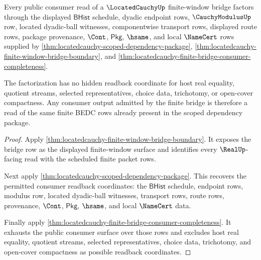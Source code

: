 \begin{theorem}
\label{thm:locatedcauchy-bridge-readback-consumer-factorization}
Every public consumer read of a $\LocatedCauchyUp$ finite-window bridge factors
through the displayed $\mathsf{BHist}$ schedule, dyadic endpoint rows,
$\CauchyModulusUp$ row, located dyadic-ball witnesses, componentwise transport
rows, displayed route rows, package provenance, $\Cont$, $\mathsf{Pkg}$,
$\hsame$, and local $\NameCert$ rows supplied by
\autoref{thm:locatedcauchy-scoped-dependency-package},
\autoref{thm:locatedcauchy-finite-window-bridge-boundary}, and
\autoref{thm:locatedcauchy-finite-bridge-consumer-completeness}.

The factorization has no hidden readback coordinate for host real equality,
quotient streams, selected representatives, choice data, trichotomy, or
open-cover compactness. Any consumer output admitted by the finite bridge is
therefore a read of the same finite BEDC rows already present in the scoped
dependency package.
\end{theorem}
\begin{proof}
Apply \autoref{thm:locatedcauchy-finite-window-bridge-boundary}. It exposes the
bridge row as the displayed finite-window surface and identifies every
$\RealUp$-facing read with the scheduled finite packet rows.

Next apply \autoref{thm:locatedcauchy-scoped-dependency-package}. This recovers
the permitted consumer readback coordinates: the $\mathsf{BHist}$ schedule,
endpoint rows, modulus row, located dyadic-ball witnesses, transport rows,
route rows, provenance, $\Cont$, $\mathsf{Pkg}$, $\hsame$, and local
$\NameCert$ data.

Finally apply \autoref{thm:locatedcauchy-finite-bridge-consumer-completeness}.
It exhausts the public consumer surface over those rows and excludes host real
equality, quotient streams, selected representatives, choice data, trichotomy,
and open-cover compactness as possible readback coordinates.
\end{proof}


